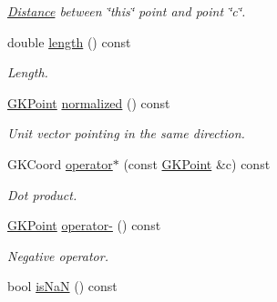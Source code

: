 \begin{DoxyCompactItemize}
\begin{DoxyCompactList}\small\item\em \hyperlink{structDistance}{Distance} between \char`\"{}this\char`\"{} point and point \char`\"{}c\char`\"{}. \end{DoxyCompactList}\item 
double \hyperlink{classGKPoint_ad3bef85423b383789d36e54bbfaf7940}{length} () const \hypertarget{classGKPoint_ad3bef85423b383789d36e54bbfaf7940}{}\label{classGKPoint_ad3bef85423b383789d36e54bbfaf7940}

\begin{DoxyCompactList}\small\item\em Length. \end{DoxyCompactList}\item 
\hyperlink{classGKPoint}{G\+K\+Point} \hyperlink{classGKPoint_a548d2c2e01d1de07acf7f8a4d4b74d26}{normalized} () const \hypertarget{classGKPoint_a548d2c2e01d1de07acf7f8a4d4b74d26}{}\label{classGKPoint_a548d2c2e01d1de07acf7f8a4d4b74d26}

\begin{DoxyCompactList}\small\item\em Unit vector pointing in the same direction. \end{DoxyCompactList}\item 
G\+K\+Coord \hyperlink{classGKPoint_a96419af7a05ce6a95577fd6b218cfb9b}{operator$\ast$} (const \hyperlink{classGKPoint}{G\+K\+Point} \&c) const \hypertarget{classGKPoint_a96419af7a05ce6a95577fd6b218cfb9b}{}\label{classGKPoint_a96419af7a05ce6a95577fd6b218cfb9b}

\begin{DoxyCompactList}\small\item\em Dot product. \end{DoxyCompactList}\item 
\hyperlink{classGKPoint}{G\+K\+Point} \hyperlink{classGKPoint_a1505ab26460c15119799e7cd98c2b073}{operator-\/} () const \hypertarget{classGKPoint_a1505ab26460c15119799e7cd98c2b073}{}\label{classGKPoint_a1505ab26460c15119799e7cd98c2b073}

\begin{DoxyCompactList}\small\item\em Negative operator. \end{DoxyCompactList}\item 
bool \hyperlink{classGKPoint_a85794c282bb266e3c729f877f9d26212}{is\+NaN} () const \hypertarget{classGKPoint_a85794c282bb266e3c729f877f9d26212}{}\label{classGKPoint_a85794c282bb266e3c729f877f9d26212}


\end{DoxyCompactItemize}
